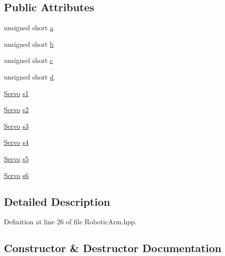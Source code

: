 \subsection*{Public Attributes}
\begin{DoxyCompactItemize}
\item 
unsigned short \hyperlink{class_robotic_arm_aaf0461b1cb35da93d2e446f50b9813a4}{a}
\item 
unsigned short \hyperlink{class_robotic_arm_a2758a63b85f492abda0e84f32fbfdd98}{b}
\item 
unsigned short \hyperlink{class_robotic_arm_a5f6cae6b67db69c97b75970dacc72ea8}{c}
\item 
unsigned short \hyperlink{class_robotic_arm_ada1f488e8627fcb18d4b15b70c593be8}{d}
\item 
\hyperlink{struct_servo}{Servo} \hyperlink{class_robotic_arm_a405680ac32df6d444683b997b785623f}{s1}
\item 
\hyperlink{struct_servo}{Servo} \hyperlink{class_robotic_arm_aeafd57f690026379493f193d94bd8210}{s2}
\item 
\hyperlink{struct_servo}{Servo} \hyperlink{class_robotic_arm_a9241e65a54080f2f642bd08a78a12f6f}{s3}
\item 
\hyperlink{struct_servo}{Servo} \hyperlink{class_robotic_arm_af0d9eb18ff10b252b79c8a986fe31170}{s4}
\item 
\hyperlink{struct_servo}{Servo} \hyperlink{class_robotic_arm_a393711dcc74eb1fba3f9e544cd2bb771}{s5}
\item 
\hyperlink{struct_servo}{Servo} \hyperlink{class_robotic_arm_a4816473ed62d262e2a29590769e82f10}{s6}
\end{DoxyCompactItemize}


\subsection{Detailed Description}


Definition at line 26 of file Robotic\+Arm.\+hpp.



\subsection{Constructor \& Destructor Documentation}
